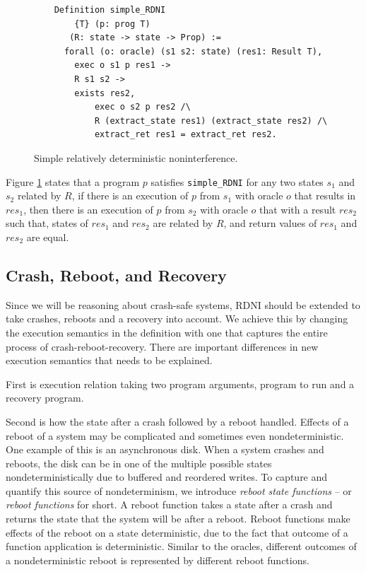 \begin{figure}[ht]
    \centering
    \begin{verbatim}
    Definition simple_RDNI
        {T} (p: prog T)
       (R: state -> state -> Prop) :=
      forall (o: oracle) (s1 s2: state) (res1: Result T),
        exec o s1 p res1 ->
        R s1 s2 ->
        exists res2, 
            exec o s2 p res2 /\
            R (extract_state res1) (extract_state res2) /\
            extract_ret res1 = extract_ret res2.
    \end{verbatim}
    \caption{Simple relatively deterministic noninterference.}
    \label{fig:RDNI_no_recovery}
\end{figure}

Figure \ref{fig:RDNI_no_recovery} states that a program $p$ satisfies \texttt{simple\_RDNI} for any two states $s_1$ and $s_2$ related by $R$, if there is an execution of $p$ from $s_1$ with oracle $o$ that results in $res_1$, then there is an execution of $p$ from $s_2$ with oracle $o$ that with a result $res_2$ such that, states of $res_1$ and $res_2$ are related by $R$, and return values of $res_1$ and $res_2$ are equal.

\subsection{Crash, Reboot, and Recovery}
Since we will be reasoning about crash-safe systems, RDNI should be extended to take crashes, reboots and a recovery into account. We achieve this by changing the execution semantics in the definition with one that captures the entire process of crash-reboot-recovery. There are  important differences in new execution semantics that needs to be explained. 

First is execution relation taking two program arguments, program to run and a recovery program. 

Second is how the state after a crash followed by a reboot handled. Effects of a reboot of a system may be complicated and sometimes even nondeterministic. One example of this is an asynchronous disk. When a system crashes and reboots, the disk can be in one of the multiple possible states nondeterministically due to buffered and reordered writes. To capture and quantify this source of nondeterminism, we introduce  \emph{reboot state functions} \--- or \emph{reboot functions} for short. A reboot function takes a state after a crash and returns the state that the system will be after a reboot. Reboot functions make effects of the reboot on a state deterministic, due to the fact that outcome of a function application is deterministic. Similar to the oracles, different outcomes of a nondeterministic reboot is represented by different reboot functions.

